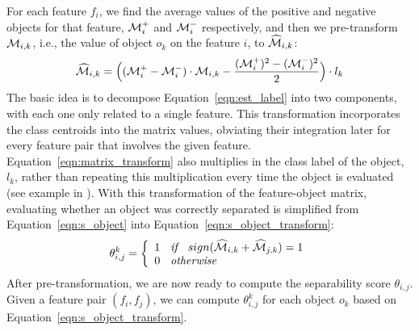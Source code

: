 For each feature $f_i$, we find the average values of the positive and negative objects for that feature, ${\mathcal{M}}_i^+$ and ${\mathcal{M}}_i^-$ respectively, and then we pre-transform ${\mathcal{M}}_{i,k}$, i.e., the value of object $o_k$ on the feature $i$, to $\widehat{{\mathcal{M}}}_{i,k}$:
\begin{equation}\label{eqn:matrix_transform}
\widehat{{\mathcal{M}}}_{i,k} = \Big( ({\mathcal{M}}_i^+-{\mathcal{M}}_i^-)\cdot {\mathcal{M}}_{i,k}-\frac{({\mathcal{M}}_i^+)^2-({\mathcal{M}}_i^-)^2}{2} \Big) \cdot l_k
\end{equation}
\noindent The basic idea is to decompose
Equation~\ref{eqn:est_label} into two components,
with each one only related to a single feature.
This transformation incorporates
the class centroids into the matrix values,
obviating their integration later
for every feature pair that involves the given feature.
Equation~\ref{eqn:matrix_transform} also multiplies
in the class label of the object, $l_k$,
rather than repeating this multiplication every time the object is evaluated (see example in \transfig). With this transformation of the feature-object matrix,
evaluating whether an object was correctly separated is simplified from Equation~\ref{eqn:s_object} into Equation~\ref{eqn:s_object_transform}:
\begin{equation}\label{eqn:s_object_transform}
\theta_{i,j}^{k}=\left\{
 \begin{array}{ll}
  1 \textit{\hspace{2mm} if \hspace{2mm}} sign(\widehat{{\mathcal{M}}}_{i,k} + \widehat{{\mathcal{M}}}_{j,k}) = 1\\
  0 \textit{\hspace{2mm} otherwise \hspace{2mm}}
 \end{array}
 \right.
\end{equation}
After pre-transformation, we are now ready
to compute the separability score $\theta_{i,j}$.
Given a feature pair $(f_i,f_j)$, we can compute $\theta_{i,j}^{k}$
for each object $o_k$ based on Equation~\ref{eqn:s_object_transform}.
